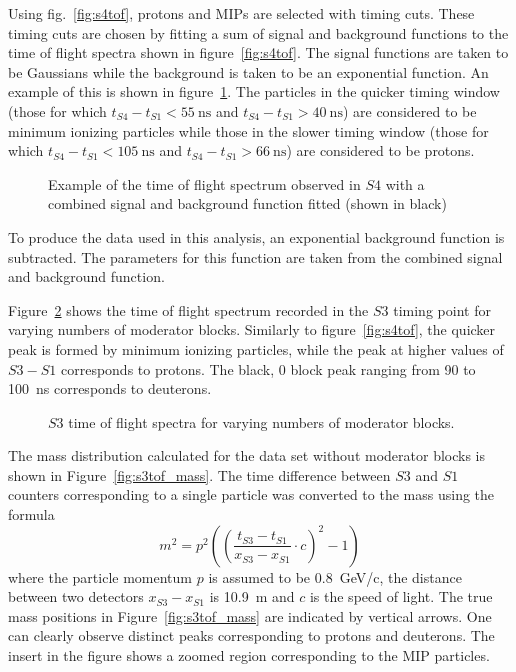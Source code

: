 	Using fig.~\ref{fig:s4tof}, protons and MIPs are selected with timing cuts. 
	These timing cuts are chosen by fitting a sum of signal and background functions to the time of flight spectra shown in figure~\ref{fig:s4tof}. 
	The signal functions are taken to be Gaussians while the background is taken to be an exponential function. 
	An example of this is shown in figure~\ref{fig:fitEx}.
	The particles in the quicker timing window (those for which $t_{S4}-t_{S1}<55~\text{ns}$ and $t_{S4}-t_{S1}>40~\text{ns}$) are considered to be minimum ionizing particles while those in the slower timing window (those for which $t_{S4}-t_{S1}<105~\text{ns}$ and $t_{S4}-t_{S1}>66~\text{ns}$) are considered to be protons.
	
	\begin{figure}[h]
		\begin{adjustbox}{max totalsize={.7\textwidth}{.62\textheight},center}
			
		\end{adjustbox}
		\caption{Example of the time of flight spectrum observed in $S4$ with a combined signal and background function fitted (shown in black)}
		\label{fig:fitEx}
	\end{figure}

	To produce the data used in this analysis, an exponential background function is subtracted. 
	The parameters for this function are taken from the combined signal and background function.

	Figure~\ref{fig:s3tof} shows the time of flight spectrum recorded in the $S3$ timing point for varying numbers of moderator blocks.
	Similarly to figure~\ref{fig:s4tof}, the quicker peak is formed by minimum ionizing particles, while the peak at higher values of $S3 - S1$ corresponds to protons.
	The black, 0 block peak ranging from 90 to 100~ns corresponds to deuterons.
	\begin{figure}[h]
		\begin{adjustbox}{max totalsize={.8\textwidth}{.5\textheight},center}
			
		\end{adjustbox}
		\caption{$S3$ time of flight spectra for varying numbers of moderator blocks.}
		\label{fig:s3tof}
	\end{figure}


    The mass distribution calculated for the data set without moderator blocks is shown in Figure~\ref{fig:s3tof_mass}. The time difference between $S3$ and $S1$ counters corresponding to a single particle was converted to the mass using the formula
    \begin{equation} 
     m^2 = p^2 \left( 
     \left(\frac{t_{S3}-t_{S1}}{x_{S3}-x_{S1}} \cdot c \right)^2
    - 1  \right)
    \end{equation}
    where the particle momentum $p$ is assumed to be 0.8~GeV/c, the distance between two detectors $x_{S3}-x_{S1}$ is 10.9~m and $c$ is the speed of light. 
    The true mass positions in Figure~\ref{fig:s3tof_mass} are indicated by vertical arrows. One can clearly observe distinct peaks corresponding to protons and deuterons. 
    The insert in the figure shows a zoomed region corresponding to the MIP particles. 
    

